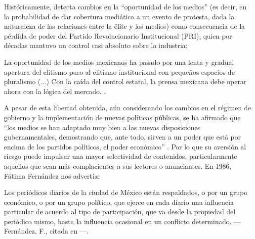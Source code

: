 \documentclass[letterpaper, 11pt]{book}
\theoremstyle{definition}
\theoremstyle{remark}
\begin{document}
Históricamente, \citet{2003_Wada_Tesis} detecta cambios en la ``oportunidad de los medios'' (es decir, en la probabilidad de dar cobertura mediática a un evento de protesta, dada la naturaleza de las relaciones entre la élite y los medios) como consecuencia de la pérdida de poder del Partido Revolucionario Institucional (PRI), quien por décadas mantuvo un control casi absoluto sobre la industria:

\begin{center}
    \begin{minipage}{0.9\linewidth}
        {\setlength{\parindent}{12pt}\small
         La oportunidad de los medios mexicanos ha pasado por una lenta y gradual apertura del elitismo puro al elitismo institucional con pequeños espacios de pluralismo (...) Con la caída del control estatal, la prensa mexicana debe operar ahora con la lógica del mercado. \normalsize \citep[114---115]{2003_Wada_Tesis}.
        }
    \end{minipage}
\end{center}

A pesar de esta libertad obtenida, aún considerando los cambios en el régimen de gobierno y la implementación de nuevas políticas públicas, se ha afirmado que ``los medios se han adaptado muy bien a las nuevas disposiciones gubernamentales, demostrando que, ante todo, sirven a un poder que está por encima de los partidos políticos, el poder económico'' \citep[223]{2011_Tesis_LaJornada}. 
Por lo que su aversión al riesgo puede impulsar una mayor selectividad de contenidos, particularmente aquellos que sean más complacientes a sus lectores o anunciantes. En 1986, Fátima Fernández nos advertía:

\begin{center}
    \begin{minipage}{0.9\linewidth}
        {\setlength{\parindent}{12pt}\small
         Los periódicos diarios de la ciudad de México están respaldados, o por un grupo económico, o por un grupo político, que ejerce en cada diario una influencia particular de acuerdo al tipo de participación, que va desde la propiedad del periódico mismo, hasta la influencia ocasional en un conflicto determinado. \normalsize ---Fernández, F., citada en \citep[206]{2011_Tesis_LaJornada}---.
        }
    \end{minipage}
\end{center}
\end{document}
